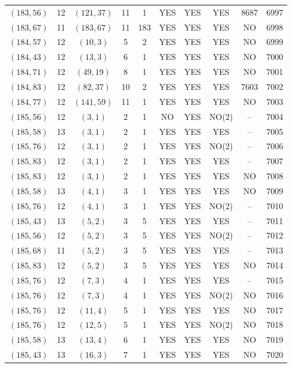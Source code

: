 \begin{longtable}{|c|c|c|c|c|c|c|c|c|c|}
$(183, 56)$ & 12 & $(121, 37)$ & 11 & 1 & YES & YES & YES & 8687 & 6997\\
$(183, 67)$ & 11 & $(183, 67)$ & 11 & 183 & YES & YES & YES & NO & 6998\\
$(184, 57)$ & 12 & $(10, 3)$ & 5 & 2 & YES & YES & YES & NO & 6999\\
$(184, 43)$ & 12 & $(13, 3)$ & 6 & 1 & YES & YES & YES & NO & 7000\\
$(184, 71)$ & 12 & $(49, 19)$ & 8 & 1 & YES & YES & YES & NO & 7001\\
$(184, 83)$ & 12 & $(82, 37)$ & 10 & 2 & YES & YES & YES & 7603 & 7002\\
$(184, 77)$ & 12 & $(141, 59)$ & 11 & 1 & YES & YES & YES & NO & 7003\\
$(185, 56)$ & 12 & $(3, 1)$ & 2 & 1 & NO & YES & NO(2) & -- & 7004\\
$(185, 58)$ & 13 & $(3, 1)$ & 2 & 1 & YES & YES & YES & -- & 7005\\
$(185, 76)$ & 12 & $(3, 1)$ & 2 & 1 & YES & YES & NO(2) & -- & 7006\\
$(185, 83)$ & 12 & $(3, 1)$ & 2 & 1 & YES & YES & YES & -- & 7007\\
$(185, 83)$ & 12 & $(3, 1)$ & 2 & 1 & YES & YES & YES & NO & 7008\\
$(185, 58)$ & 13 & $(4, 1)$ & 3 & 1 & YES & YES & YES & NO & 7009\\
$(185, 76)$ & 12 & $(4, 1)$ & 3 & 1 & YES & YES & NO(2) & -- & 7010\\
$(185, 43)$ & 13 & $(5, 2)$ & 3 & 5 & YES & YES & YES & -- & 7011\\
$(185, 56)$ & 12 & $(5, 2)$ & 3 & 5 & YES & YES & NO(2) & -- & 7012\\
$(185, 68)$ & 11 & $(5, 2)$ & 3 & 5 & YES & YES & YES & -- & 7013\\
$(185, 83)$ & 12 & $(5, 2)$ & 3 & 5 & YES & YES & YES & NO & 7014\\
$(185, 76)$ & 12 & $(7, 3)$ & 4 & 1 & YES & YES & YES & -- & 7015\\
$(185, 76)$ & 12 & $(7, 3)$ & 4 & 1 & YES & YES & NO(2) & NO & 7016\\
$(185, 76)$ & 12 & $(11, 4)$ & 5 & 1 & YES & YES & YES & NO & 7017\\
$(185, 76)$ & 12 & $(12, 5)$ & 5 & 1 & YES & YES & NO(2) & NO & 7018\\
$(185, 58)$ & 13 & $(13, 4)$ & 6 & 1 & YES & YES & YES & NO & 7019\\
$(185, 43)$ & 13 & $(16, 3)$ & 7 & 1 & YES & YES & YES & NO & 7020\\

\end{longtable}
